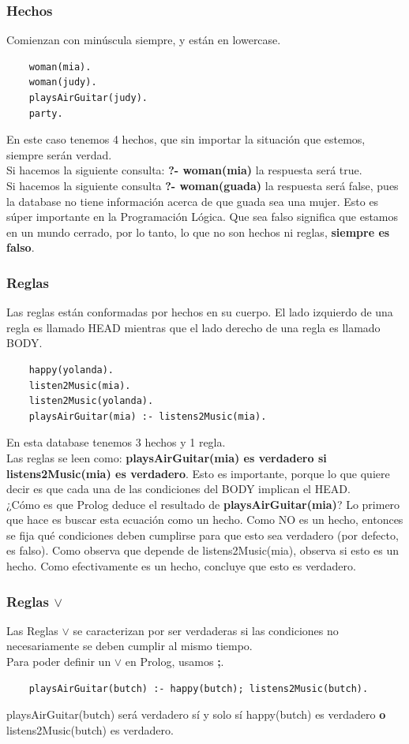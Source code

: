 \documentclass[10pt,a4paper]{article}
\begin{document}
\subsubsection*{Hechos}
Comienzan con minúscula siempre, y están en lowercase.
\begin{lstlisting}
    woman(mia).
    woman(judy).
    playsAirGuitar(judy).
    party. 
\end{lstlisting}
En este caso tenemos 4 hechos, que sin importar la situación que estemos, siempre serán verdad. \\
Si hacemos la siguiente consulta: \textbf{?- woman(mia)} la respuesta será true. \\
Si hacemos la siguiente consulta \textbf{?- woman(guada)} la respuesta será false, pues la database no tiene información acerca de que guada sea una mujer. Esto es súper importante en la Programación Lógica. Que sea falso significa que estamos en un mundo cerrado, por lo tanto, lo que no son hechos ni reglas, \textbf{siempre es falso}.
\subsubsection*{Reglas}
Las reglas están conformadas por hechos en su cuerpo. El lado izquierdo de una regla es llamado HEAD mientras que el lado derecho de una regla es llamado BODY. \\
\begin{lstlisting}
    happy(yolanda).
    listen2Music(mia).
    listen2Music(yolanda).
    playsAirGuitar(mia) :- listens2Music(mia).
\end{lstlisting}
En esta database tenemos 3 hechos y 1 regla. \\
Las reglas se leen como: \textbf{playsAirGuitar(mia) es verdadero si listens2Music(mia) es verdadero}. Esto es importante, porque lo que quiere decir es que cada una de las condiciones del BODY implican el HEAD. \\
¿Cómo es que Prolog deduce el resultado de \textbf{playsAirGuitar(mia)}? Lo primero que hace es buscar esta ecuación como un hecho. Como NO es un hecho, entonces se fija qué condiciones deben cumplirse para que esto sea verdadero (por defecto, es falso). Como observa que depende de listens2Music(mia), observa si esto es un hecho. Como efectivamente es un hecho, concluye que esto es verdadero. 
\subsubsection*{Reglas $\lor$}
Las Reglas $\lor$ se caracterizan por ser verdaderas si las condiciones no necesariamente se deben cumplir al mismo tiempo. \\
Para poder definir un $\lor$ en Prolog, usamos \textbf{;}.
\begin{lstlisting}
    playsAirGuitar(butch) :- happy(butch); listens2Music(butch).
\end{lstlisting}
playsAirGuitar(butch) será verdadero sí y solo sí happy(butch) es verdadero \textbf{o} listens2Music(butch) es verdadero.
\end{document}
